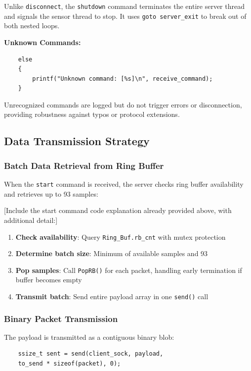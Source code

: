 Unlike \texttt{disconnect}, the \texttt{shutdown} command terminates the entire server thread and signals the sensor thread to stop. It uses \texttt{goto server\_exit} to break out of both nested loops.

\textbf{Unknown Commands:}

\begin{verbatim}
	else
	{
		printf("Unknown command: [%s]\n", receive_command);
	}
\end{verbatim}

Unrecognized commands are logged but do not trigger errors or disconnection, providing robustness against typos or protocol extensions.

\subsection{Data Transmission Strategy}

\subsubsection{Batch Data Retrieval from Ring Buffer}

When the \texttt{start} command is received, the server checks ring buffer availability and retrieves up to 93 samples:

[Include the start command code explanation already provided above, with additional detail:]

\begin{enumerate}
	\item \textbf{Check availability}: Query \texttt{Ring\_Buf.rb\_cnt} with mutex protection
	\item \textbf{Determine batch size}: Minimum of available samples and 93
	\item \textbf{Pop samples}: Call \texttt{PopRB()} for each packet, handling early termination if buffer becomes empty
	\item \textbf{Transmit batch}: Send entire payload array in one \texttt{send()} call
\end{enumerate}

\subsubsection{Binary Packet Transmission}

The payload is transmitted as a contiguous binary blob:

\begin{verbatim}
	ssize_t sent = send(client_sock, payload,
	to_send * sizeof(packet), 0);
\end{verbatim}

